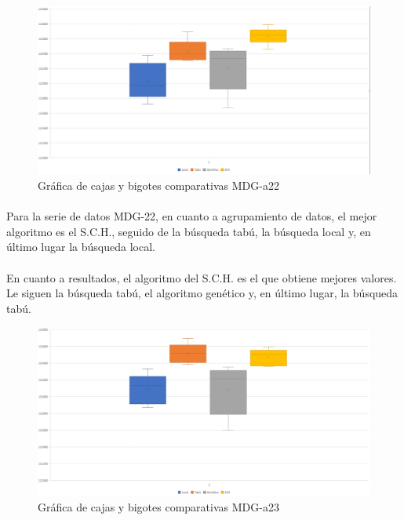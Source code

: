 	\begin{figure}[H]
		\centering
		\includegraphics[scale=0.3]{img/finalMDG2.png}
		\caption{Gráfica de cajas y bigotes comparativas MDG-a22}
		\label{MDG-a22_final}
	\end{figure}

	\paragraph{}Para la serie de datos MDG-22, en cuanto a agrupamiento de datos, el mejor algoritmo es el S.C.H., seguido de la búsqueda tabú, la búsqueda local y, en último lugar la búsqueda local.
	
	\paragraph{}En cuanto a resultados, el algoritmo del S.C.H. es el que obtiene mejores valores. Le siguen la búsqueda tabú, el algoritmo genético y, en último lugar, la búsqueda tabú.

	\begin{figure}[H]
		\centering
		\includegraphics[scale=0.3]{img/finalMDG3.png}
		\caption{Gráfica de cajas y bigotes comparativas MDG-a23}
		\label{MDG-a23_final}
	\end{figure}

